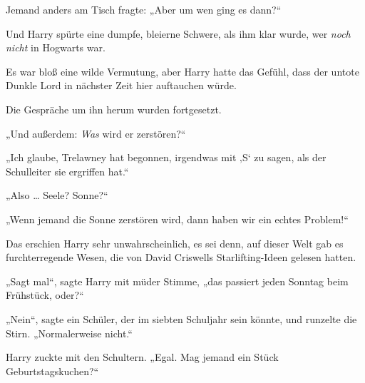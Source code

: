 Jemand anders am Tisch fragte:
„Aber um wen ging es dann?“

Und Harry spürte eine dumpfe, bleierne Schwere, als ihm klar wurde, wer \emph{noch nicht} in Hogwarts war.

Es war bloß eine wilde Vermutung, aber Harry hatte das Gefühl, dass der untote Dunkle Lord in nächster Zeit hier auftauchen würde.

Die Gespräche um ihn herum wurden fortgesetzt.

„Und außerdem: \emph{Was} wird er zerstören?“

„Ich glaube, Trelawney hat begonnen, irgendwas mit ‚S‘ zu sagen, als der Schulleiter sie ergriffen hat.“

„Also … Seele? Sonne?“

„Wenn jemand die Sonne zerstören wird, dann haben wir ein echtes Problem!“

Das erschien Harry sehr unwahrscheinlich, es sei denn, auf dieser Welt gab es furchterregende Wesen, die von David Criswells Starlifting-Ideen gelesen hatten.%

„Sagt mal“, sagte Harry mit müder Stimme, „das passiert jeden Sonntag beim Frühstück, oder?“

„Nein“, sagte ein Schüler, der im siebten Schuljahr sein könnte, und runzelte die Stirn.
„Normalerweise nicht.“

Harry zuckte mit den Schultern.
„Egal. Mag jemand ein Stück Geburtstagskuchen?“

